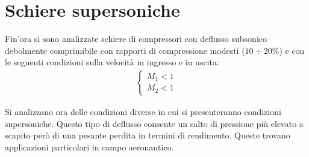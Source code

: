 \section{Schiere supersoniche}
Fin'ora si sono analizzate schiere di compressori con deflusso subsonico debolmente comprimibile con rapporti di compressione modesti ($10 \div 20 \%$) e con le seguenti condizioni sulla velocità in ingresso e in uscita:
\begin{align*}
\begin{cases}
M_1 <1\\
M_2 <1
\end{cases}
\end{align*} 

Si analizzano ora delle condizioni diverse in cui si presenteranno condizioni supersoniche. Questo tipo di deflusso consente un salto di pressione più elevato a scapito però di una pesante perdita in termini di rendimento. Queste trovano applicazioni particolari in campo aeronautico. 
